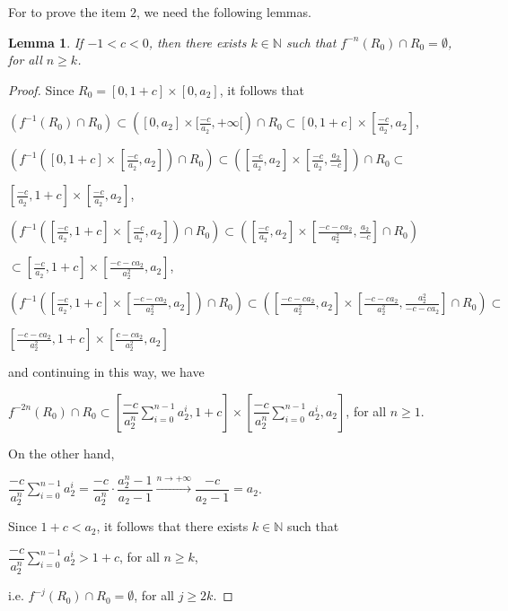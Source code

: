 \documentclass[11pt]{amsart}
\newtheorem{lemma}[theorem]{Lemma}
\theoremstyle{definition}
\begin{document}
For to prove the item $2$, we need the following lemmas.

\begin{lemma} \label{lemarzeromenos}
	If $-1<c<0$, then there exists $k\in\mathbb{N}$ such that
	$f^{-n}(R_0)\cap R_0=\emptyset$, for all $n\geq k$.
\end{lemma}
\begin{proof} Since $R_0=[0,1+c]\times [0,a_2]$, it follows that

\noindent $(f^{-1}(R_0)\cap R_0)\subset ([0,a_2]\times [\frac{-c}{a_2},+\infty[)\cap R_0\subset [0,1+c]\times[\frac{-c}{a_2},a_2]$,

\noindent $(f^{-1}([0,1+c]\times [\frac{-c}{a_2},a_2])\cap R_0)\subset ([\frac{-c}{a_2},a_2]\times [\frac{-c}{a_2},\frac{a_2}{-c}])\cap R_0\subset$
		
\hfill $[\frac{-c}{a_2},1+c]\times[\frac{-c}{a_2},a_2]$,
		
\noindent $(f^{-1}([\frac{-c}{a_2},1+c]\times[\frac{-c}{a_2},a_2])\cap R_0)\subset ([\frac{-c}{a_2},a_2]\times[\frac{-c-ca_2}{a_2^2},\frac{a_2}{-c} ]\cap R_0)$

\hfill $\subset [\frac{-c}{a_2},1+c]\times[\frac{-c-ca_2}{a_2^2},a_2]$,

\noindent $(f^{-1}([\frac{-c}{a_2},1+c]\times[\frac{-c-ca_2}{a_2^2},a_2])\cap R_0)\subset ([\frac{-c-ca_2}{a_2^2},a_2] \times[\frac{-c-ca_2}{a_2^2},\frac{a_2^2}{-c-ca_2} ]\cap R_0) \subset$

\hfill $[\frac{-c-ca_2}{a_2^2},1+c]\times[\frac{c-ca_2}{a_2^2},a_2]$

\noindent and continuing in this way, we have
	\begin{center}
		$f^{-2n}(R_0)\cap R_0\subset \left[\displaystyle
		\dfrac{-c}{a_2^n}\sum_{i=0}^{n-1} a_2^i,1+c\right]\times
		\left[\dfrac{-c}{a_2^n}\displaystyle \sum_{i=0}^{n-1}
		a_2^i,a_2\right]$, for all $n\geq 1$.
	\end{center}
	
	On the other hand,
	
	\begin{center}
		$\dfrac{-c}{a_2^n}\displaystyle \sum_{i=0}^{n-1}
		a_2^i=\dfrac{-c}{a_2^n}\cdot \dfrac{a_2^n-1}{a_2-1}\xrightarrow{n\to+\infty}\dfrac{-c}{a_2-1}=a_2$.
	\end{center}
	
	Since $1+c<a_2$, it follows that there exists $k\in\mathbb{N}$ such that
	
	\begin{center}
		$\dfrac{-c}{a_2^n}\displaystyle \sum_{i=0}^{n-1} a_2^i>1+c$, for all $n\geq k$,
	\end{center}
	
	\noindent i.e. $f^{-j}(R_0)\cap R_0=\emptyset$, for all $j\geq 2k$.
\end{proof}
\end{document}
